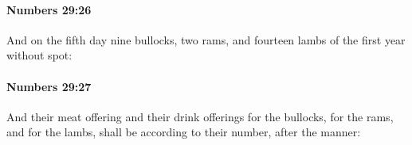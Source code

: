 		\paragraph{Numbers 29:26} %
			\label{NUMBERS-29-26}

			And on the fifth day nine bullocks, two rams, and fourteen lambs of the first year without spot:


		\paragraph{Numbers 29:27} %
			\label{NUMBERS-29-27}

			And their meat offering and their drink offerings for the bullocks, for the rams, and for the lambs, shall be according to their number, after the manner:


